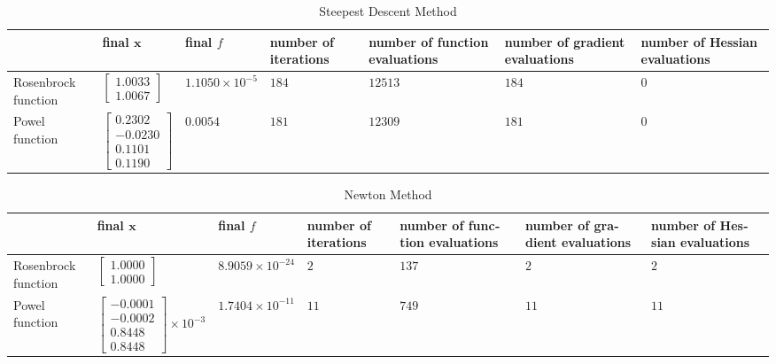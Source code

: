\documentclass[a4paper]{article}
\theoremstyle{plain}
\theoremstyle{definition}
\theoremstyle{remark}
\begin{document}
\begin{latin}
\begin{table}[h]
	\centering
	\sffamily \begin{tabularx}{1\textwidth}{|>{\centering\arraybackslash}m{2cm}|>{\centering\arraybackslash}m{2cm}|>{\centering\arraybackslash}m{2cm}|>{\centering\arraybackslash}m{2cm}|>{\centering\arraybackslash}m{2cm}|>{\centering\arraybackslash}m{2cm}|>{\centering\arraybackslash}m{1.95cm}|}
		\hline
		& final $\mathbf{x}$ & final $f$ & number of iterations & number of function evaluations & number of gradient evaluations & number of Hessian evaluations\\
		\hline
		\rule{0pt}{20pt} Rosenbrock function & $\begin{bmatrix}
		1.0033\\ 1.0067
		\end{bmatrix}$  & $1.1050\times10^{-5}$   &  $184$  &  $12513$  &  $184$  &  $0$  \\
		\hline
		\rule{0pt}{30pt}Powel function & $\begin{bmatrix}
		   0.2302\\
		-0.0230\\
		0.1101\\
		0.1190
		\end{bmatrix}$  & $0.0054$   &  $181$  & $12309$   &  $181$  & $0$   \\
		\hline
	\end{tabularx} \normalfont
	\caption{Steepest Descent Method}
\end{table}
\begin{table}[h]
	\centering
	\sffamily \begin{tabularx}{1\textwidth}{|>{\centering\arraybackslash}m{1.7cm}|>{\centering\arraybackslash}m{2.4cm}|>{\centering\arraybackslash}m{2cm}|>{\centering\arraybackslash}m{2cm}|>{\centering\arraybackslash}m{2cm}|>{\centering\arraybackslash}m{2cm}|>{\centering\arraybackslash}m{1.85cm}|}
		\hline
		& final $\mathbf{x}$ & final $f$ & number of iterations & number of function evaluations & number of gradient evaluations & number of Hessian evaluations\\
		\hline
		\rule{0pt}{5pt} Rosenbrock function & $\begin{bmatrix}
		1.0000\\ 1.0000
		\end{bmatrix}$  &\small $8.9059\times10^{-24}$\normalsize   &  $2$  &  $137$  &  $2$  &  $2$  \\
		
		\hline
		\rule{0pt}{30pt}Powel function & \footnotesize$\begin{bmatrix}
		-0.0001\\
		-0.0002\\
		0.8448\\
		0.8448
		\end{bmatrix}\times10^{-3}$\normalsize  &  \small$   1.7404\times10^{-11}$ \normalsize & $11$   & $749$   &  $11$  & $11$   \\
		\hline
	\end{tabularx} \normalfont
	\caption{Newton Method}
\end{table}

\end{latin}
\end{document}
